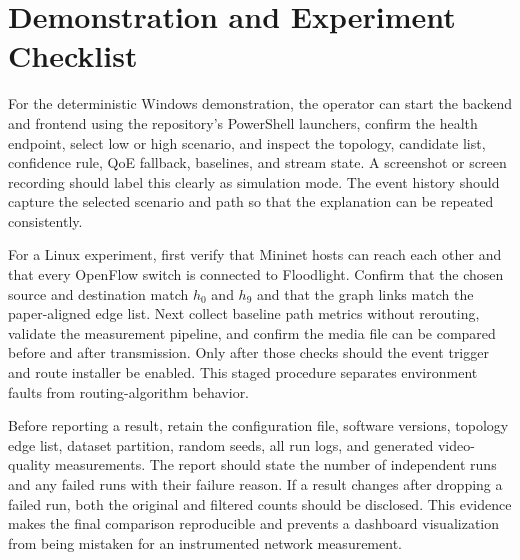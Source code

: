 \documentclass[conference]{IEEEtran}
\begin{document}
\section{Demonstration and Experiment Checklist}
For the deterministic Windows demonstration, the operator can start the backend and frontend using the repository's PowerShell launchers, confirm the health endpoint, select low or high scenario, and inspect the topology, candidate list, confidence rule, QoE fallback, baselines, and stream state. A screenshot or screen recording should label this clearly as simulation mode. The event history should capture the selected scenario and path so that the explanation can be repeated consistently.

For a Linux experiment, first verify that Mininet hosts can reach each other and that every OpenFlow switch is connected to Floodlight. Confirm that the chosen source and destination match $h_0$ and $h_9$ and that the graph links match the paper-aligned edge list. Next collect baseline path metrics without rerouting, validate the measurement pipeline, and confirm the media file can be compared before and after transmission. Only after those checks should the event trigger and route installer be enabled. This staged procedure separates environment faults from routing-algorithm behavior.

Before reporting a result, retain the configuration file, software versions, topology edge list, dataset partition, random seeds, all run logs, and generated video-quality measurements. The report should state the number of independent runs and any failed runs with their failure reason. If a result changes after dropping a failed run, both the original and filtered counts should be disclosed. This evidence makes the final comparison reproducible and prevents a dashboard visualization from being mistaken for an instrumented network measurement.



\end{document}

